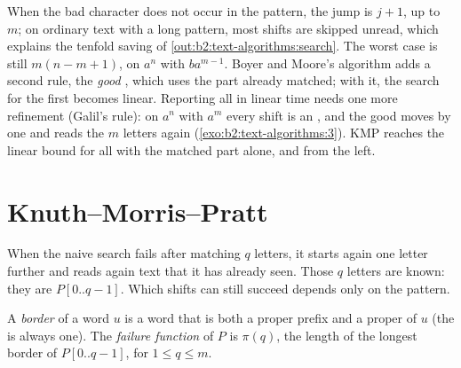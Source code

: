 When the bad character does not occur in the pattern, the jump is $j + 1$, up to $m$; on ordinary text with a long
pattern, most shifts are skipped unread, which explains the tenfold saving of \cref{out:b2:text-algorithms:search}. The
worst case is still $m(n - m + 1)$, on $a^n$ with $ba^{m-1}$. Boyer and Moore's algorithm adds a second rule, the
\emph{good }, which uses the part already matched; with it, the search for the first  becomes
linear. Reporting all  in linear time needs one more refinement (Galil's rule): on $a^n$ with $a^m$ every
shift is an , and the good  moves by one and reads the $m$ letters again
(\cref{exo:b2:text-algorithms:3}). KMP reaches the linear bound for all  with the matched part alone, and
from the left.

\section{Knuth--Morris--Pratt}\label{sec:b2:text-algorithms:kmp}

When the naive search fails after matching $q$ letters, it starts again one letter further and reads again text that it
has already seen. Those $q$ letters are known: they are $P[0..q-1]$. Which shifts can still succeed depends only on the
pattern.

\begin{definition}\label{def:b2:text-algorithms:border}
A \emph{border} of a word $u$ is a word that is both a proper prefix and a proper  of $u$
(the  is always one). The \emph{failure function} of $P$ is $\pi(q)$, the length of the
longest border of $P[0..q-1]$, for $1 \leq q \leq m$.
\end{definition}

